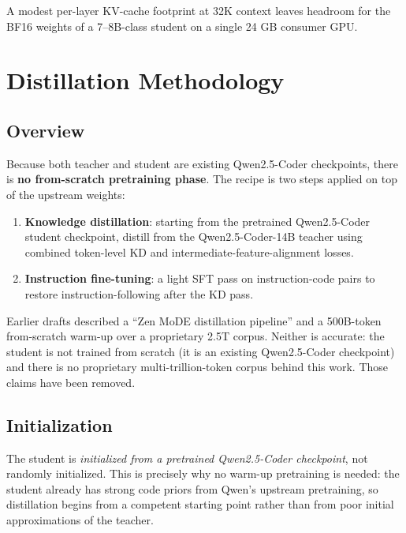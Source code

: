 \documentclass[11pt,a4paper]{article}
\begin{document}
A modest per-layer KV-cache footprint at 32K context leaves headroom for the BF16 weights of a
7--8B-class student on a single 24 GB consumer GPU.

\section{Distillation Methodology}

\subsection{Overview}

Because both teacher and student are existing Qwen2.5-Coder \cite{qwen25coder} checkpoints, there is
\textbf{no from-scratch pretraining phase}. The recipe is two steps applied on top of the upstream
weights:

\begin{enumerate}
  \item \textbf{Knowledge distillation}: starting from the pretrained Qwen2.5-Coder student checkpoint,
        distill from the Qwen2.5-Coder-14B teacher using combined token-level KD and
        intermediate-feature-alignment losses.
  \item \textbf{Instruction fine-tuning}: a light SFT pass on instruction-code pairs to restore
        instruction-following after the KD pass.
\end{enumerate}

\noindent Earlier drafts described a ``Zen MoDE distillation pipeline'' and a 500B-token from-scratch
warm-up over a proprietary 2.5T corpus. Neither is accurate: the student is not trained from scratch
(it is an existing Qwen2.5-Coder checkpoint) and there is no proprietary multi-trillion-token corpus
behind this work. Those claims have been removed.

\subsection{Initialization}

The student is \emph{initialized from a pretrained Qwen2.5-Coder checkpoint}, not randomly initialized.
This is precisely why no warm-up pretraining is needed: the student already has strong code priors from
Qwen's upstream pretraining, so distillation begins from a competent starting point rather than from
poor initial approximations of the teacher.
\end{document}
